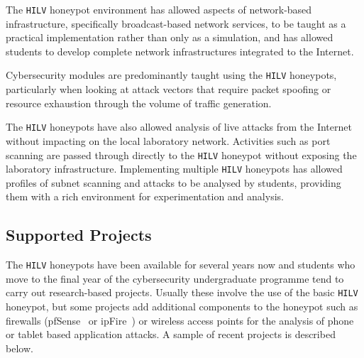 \documentclass{ieeeaccess}
\begin{document}
The \texttt{HILV} honeypot environment has allowed aspects of network-based
infrastructure, specifically broadcast-based network services, to be taught as
a practical implementation rather than only as a simulation, and has allowed
students to develop complete network infrastructures integrated to the
Internet.

Cybersecurity modules are predominantly taught using the \texttt{HILV}
honeypots, particularly when looking at attack vectors that require packet
spoofing or resource exhaustion through the volume of traffic generation.

The \texttt{HILV} honeypots have also allowed analysis of live attacks from the
Internet without impacting on the local laboratory network. Activities such as
port scanning are passed through directly to the \texttt{HILV} honeypot without
exposing the laboratory infrastructure. Implementing multiple \texttt{HILV}
honeypots has allowed profiles of subnet scanning and attacks to be analysed by
students, providing them with a rich environment for experimentation and
analysis.

\subsection{Supported Projects\label{Projects}}
The \texttt{HILV} honeypots have been available for several years now and
students who move to the final year of the cybersecurity undergraduate
programme tend to carry out research-based projects. Usually these involve the
use of the basic \texttt{HILV} honeypot, but some projects add additional
components to the honeypot such as firewalls (pfSense~\cite{PFSENSE:18} or
ipFire~\cite{IPFIRE:18}) or wireless access points for the analysis of phone or
tablet based application attacks. A sample of recent projects is described below.
\end{document}
